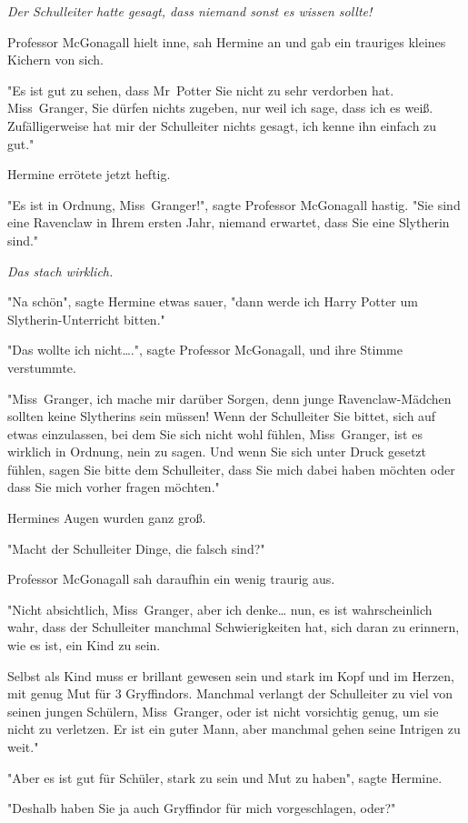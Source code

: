 {\emph{Der Schulleiter hatte gesagt, dass niemand sonst es wissen sollte!}

Professor McGonagall hielt inne, sah Hermine an und gab ein trauriges kleines Kichern von sich.

"Es ist gut zu sehen, dass Mr~Potter Sie nicht zu sehr verdorben hat. Miss~Granger, Sie dürfen nichts zugeben, nur weil ich sage, dass ich es weiß. Zufälligerweise hat mir der Schulleiter nichts gesagt, ich kenne ihn einfach zu gut."

Hermine errötete jetzt heftig.

"Es ist in Ordnung, Miss~Granger!", sagte Professor McGonagall hastig. "Sie sind eine Ravenclaw in Ihrem ersten Jahr, niemand erwartet, dass Sie eine Slytherin sind."

\emph{Das stach wirklich.}

"Na schön", sagte Hermine etwas sauer, "dann werde ich Harry Potter um Slytherin-Unterricht bitten."

"Das wollte ich nicht….", sagte Professor McGonagall, und ihre Stimme verstummte.

"Miss~Granger, ich mache mir darüber Sorgen, denn junge Ravenclaw-Mädchen sollten keine Slytherins sein müssen! Wenn der Schulleiter Sie bittet, sich auf etwas einzulassen, bei dem Sie sich nicht wohl fühlen, Miss~Granger, ist es wirklich in Ordnung, nein zu sagen. Und wenn Sie sich unter Druck gesetzt fühlen, sagen Sie bitte dem Schulleiter, dass Sie mich dabei haben möchten oder dass Sie mich vorher fragen möchten."

Hermines Augen wurden ganz groß.

"Macht der Schulleiter Dinge, die falsch sind?"

Professor McGonagall sah daraufhin ein wenig traurig aus.

"Nicht absichtlich, Miss~Granger, aber ich denke… nun, es ist wahrscheinlich wahr, dass der Schulleiter manchmal Schwierigkeiten hat, sich daran zu erinnern, wie es ist, ein Kind zu sein.

Selbst als Kind muss er brillant gewesen sein und stark im Kopf und im Herzen, mit genug Mut für 3 Gryffindors. Manchmal verlangt der Schulleiter zu viel von seinen jungen Schülern, Miss~Granger, oder ist nicht vorsichtig genug, um sie nicht zu verletzen. Er ist ein guter Mann, aber manchmal gehen seine Intrigen zu weit."

"Aber es ist gut für Schüler, stark zu sein und Mut zu haben", sagte Hermine.

"Deshalb haben Sie ja auch Gryffindor für mich vorgeschlagen, oder?"

}
